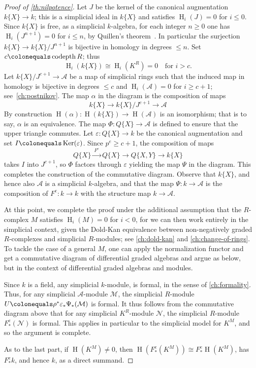 \documentclass{amsart}
\newcommand{\codepth}{\operatorname{codepth}}
\newcommand{\hh}{\operatorname{H}}
\newcommand{\Ker}{\operatorname{Ker}}
\theoremstyle{definition}
\theoremstyle{remark}
\numberwithin{equation}{subsection}
\begin{document}
\begin{proof}[Proof of \cref{th:nilpotence}]
Let $J$ be the kernel of the canonical augmentation $k\{X\}\to k$; this is a simplicial ideal in $k\{X\}$ and satisfies $\hh_i(J)=0$ for $i\le 0$. Since $k\{X\}$ is free, as a simplicial $k$-algebra, for each integer $n\ge 0$ one has $\hh_i(J^{n+1})=0$ for $i\le n$, by Quillen's theorem~\cite[Theorem~6.12]{Quillen:1970}. In particular the surjection $ k\{X\} \to k\{X\}/J^{n+1}$ is bijective in homology in degrees $\le n$. Set $c\colonequals \codepth R$;
thus
\[
\hh_i(k\{X\})\cong \hh_i(K^R)=0 \quad\text{for $i>c$.}
\]
Let $k\{X\}/J^{c+1}\to \mathcal{A}$ be a map of simplicial rings such that the induced map in homology is bijective in degrees $\le c$ and $\hh_i(\mathcal A)=0$ for $i\ge c+1$; see~\cref{ch:postnikov}. The map $\alpha$ in the diagram is the composition of maps
\[
k\{X\} \longrightarrow k\{X\}/J^{c+1} \longrightarrow \mathcal{A}
\]
By construction $\hh(\alpha)\colon \hh(k\{X\})\to \hh(\mathcal{A})$ is an isomorphism; that is to say, $\alpha$ is an equivalence. The map $\Phi\colon Q\{X\}\to\mathcal A$ is defined to ensure that the upper triangle commutes.
Let $\varepsilon \colon Q\{X\}\to k$ be the canonical augmentation and set $I\colonequals \Ker(\varepsilon)$. Since $p^e\ge c+1$, the composition of maps
\[
Q\{X\}\xrightarrow{\ F ^e\ } Q\{X\}\longrightarrow Q\{X,Y\}\longrightarrow k\{X\}
\]
takes $I$ into $J^{c+1}$, so $\Phi$ factors through $\varepsilon$ yielding the map $\Psi$ in the diagram. This completes the construction of the commutative diagram. Observe that $k\{X\}$, and hence also $\mathcal A$ is a simplicial $k$-algebra, and that the map $\Psi\colon k\to \mathcal A$ is the composition of $F ^e\colon k\to k$ with the structure map $k\to \mathcal A$.

At this point, we complete the proof under the additional assumption that the $R$-complex $M$ satisfies $\hh_i(M)=0$ for $i<0$, for we can then work entirely in the simplicial context, given the Dold-Kan equivalence between non-negatively graded $R$-complexes and simplicial $R$-modules; see \cref{ch:dold-kan} and \cref{ch:change-of-rings}. To tackle the case of a general $M$, one can apply the normalization functor and get a commutative diagram of differential graded algebras and argue as below, but in the context of differential graded algebras and modules.

Since $k$ is a field, any simplicial $k$-module, is formal, in the sense of \cref{ch:formality}. Thus, for any simplicial $\mathcal A$-module $\mathcal M$, the simplicial $R$-module $U\colonequals \rho^*\varepsilon_*\Psi_*(\mathcal M)$ is formal. It thus follows from the commutative diagram above that for any simplicial $K^R$-module $\mathcal N$, the simplicial $R$-module $F ^e_*(\mathcal N)$ is formal. This applies in particular to the simplicial model for $K^M$, and so the argument is complete.

As to the last part, if $\hh(K^M)\ne 0$, then $\hh(F ^e_*(K^M)) \cong F ^e_* \hh(K^M)$, has $F ^e_*k$, and hence $k$, as a direct summand.
\end{proof}
\end{document}
